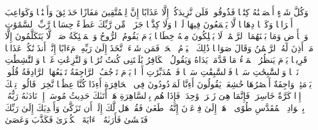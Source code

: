 \startbuffer[\q:78:29]
وَكُلَّ شَیۡءٍ أَحۡصَیۡنَٰهُ كِتَٰبࣰا%
\stopbuffer%
\startbuffer[\q:78:30]
فَذُوقُوا۟ فَلَن نَّزِیدَكُمۡ إِلَّا عَذَابًا%
\stopbuffer%
\startbuffer[\q:78:31]
إِنَّ لِلۡمُتَّقِینَ مَفَازًا%
\stopbuffer%
\startbuffer[\q:78:32]
حَدَاۤئِقَ وَأَعۡنَٰبࣰا%
\stopbuffer%
\startbuffer[\q:78:33]
وَكَوَاعِبَ أَتۡرَابࣰا%
\stopbuffer%
\startbuffer[\q:78:34]
وَكَأۡسࣰا دِهَاقࣰا%
\stopbuffer%
\startbuffer[\q:78:35]
لَّا یَسۡمَعُونَ فِیهَا لَغۡوࣰا وَلَا كِذَّٰبࣰا%
\stopbuffer%
\startbuffer[\q:78:36]
جَزَاۤءࣰ مِّن رَّبِّكَ عَطَاۤءً حِسَابࣰا%
\stopbuffer%
\startbuffer[\q:78:37]
رَّبِّ ٱلسَّمَٰوَٰتِ وَٱلۡأَرۡضِ وَمَا بَیۡنَهُمَا ٱلرَّحۡمَٰنِۖ لَا یَمۡلِكُونَ مِنۡهُ خِطَابࣰا%
\stopbuffer%
\startbuffer[\q:78:38]
یَوۡمَ یَقُومُ ٱلرُّوحُ وَٱلۡمَلَٰۤئِكَةُ صَفࣰّاۖ لَّا یَتَكَلَّمُونَ إِلَّا مَنۡ أَذِنَ لَهُ ٱلرَّحۡمَٰنُ وَقَالَ صَوَابࣰا%
\stopbuffer%
\startbuffer[\q:78:39]
ذَٰلِكَ ٱلۡیَوۡمُ ٱلۡحَقُّۖ فَمَن شَاۤءَ ٱتَّخَذَ إِلَىٰ رَبِّهِۦ مَءَابًا%
\stopbuffer%
\startbuffer[\q:78:40]
إِنَّاۤ أَنذَرۡنَٰكُمۡ عَذَابࣰا قَرِیبࣰا یَوۡمَ یَنظُرُ ٱلۡمَرۡءُ مَا قَدَّمَتۡ یَدَاهُ وَیَقُولُ ٱلۡكَافِرُ یَٰلَیۡتَنِی كُنتُ تُرَٰبَۢا%
\stopbuffer%
\startbuffer[\q:79:1]
وَٱلنَّٰزِعَٰتِ غَرۡقࣰا%
\stopbuffer%
\startbuffer[\q:79:2]
وَٱلنَّٰشِطَٰتِ نَشۡطࣰا%
\stopbuffer%
\startbuffer[\q:79:3]
وَٱلسَّٰبِحَٰتِ سَبۡحࣰا%
\stopbuffer%
\startbuffer[\q:79:4]
فَٱلسَّٰبِقَٰتِ سَبۡقࣰا%
\stopbuffer%
\startbuffer[\q:79:5]
فَٱلۡمُدَبِّرَٰتِ أَمۡرࣰا%
\stopbuffer%
\startbuffer[\q:79:6]
یَوۡمَ تَرۡجُفُ ٱلرَّاجِفَةُ%
\stopbuffer%
\startbuffer[\q:79:7]
تَتۡبَعُهَا ٱلرَّادِفَةُ%
\stopbuffer%
\startbuffer[\q:79:8]
قُلُوبࣱ یَوۡمَئِذࣲ وَاجِفَةٌ%
\stopbuffer%
\startbuffer[\q:79:9]
أَبۡصَٰرُهَا خَٰشِعَةࣱ%
\stopbuffer%
\startbuffer[\q:79:10]
یَقُولُونَ أَءِنَّا لَمَرۡدُودُونَ فِی ٱلۡحَافِرَةِ%
\stopbuffer%
\startbuffer[\q:79:11]
أَءِذَا كُنَّا عِظَٰمࣰا نَّخِرَةࣰ%
\stopbuffer%
\startbuffer[\q:79:12]
قَالُوا۟ تِلۡكَ إِذࣰا كَرَّةٌ خَاسِرَةࣱ%
\stopbuffer%
\startbuffer[\q:79:13]
فَإِنَّمَا هِیَ زَجۡرَةࣱ وَٰحِدَةࣱ%
\stopbuffer%
\startbuffer[\q:79:14]
فَإِذَا هُم بِٱلسَّاهِرَةِ%
\stopbuffer%
\startbuffer[\q:79:15]
هَلۡ أَتَىٰكَ حَدِیثُ مُوسَىٰۤ%
\stopbuffer%
\startbuffer[\q:79:16]
إِذۡ نَادَىٰهُ رَبُّهُۥ بِٱلۡوَادِ ٱلۡمُقَدَّسِ طُوًى%
\stopbuffer%
\startbuffer[\q:79:17]
ٱذۡهَبۡ إِلَىٰ فِرۡعَوۡنَ إِنَّهُۥ طَغَىٰ%
\stopbuffer%
\startbuffer[\q:79:18]
فَقُلۡ هَل لَّكَ إِلَىٰۤ أَن تَزَكَّىٰ%
\stopbuffer%
\startbuffer[\q:79:19]
وَأَهۡدِیَكَ إِلَىٰ رَبِّكَ فَتَخۡشَىٰ%
\stopbuffer%
\startbuffer[\q:79:20]
فَأَرَىٰهُ ٱلۡءَایَةَ ٱلۡكُبۡرَىٰ%
\stopbuffer%
\startbuffer[\q:79:21]
فَكَذَّبَ وَعَصَىٰ%
\stopbuffer%
\startbuffer[\q:79:22]
